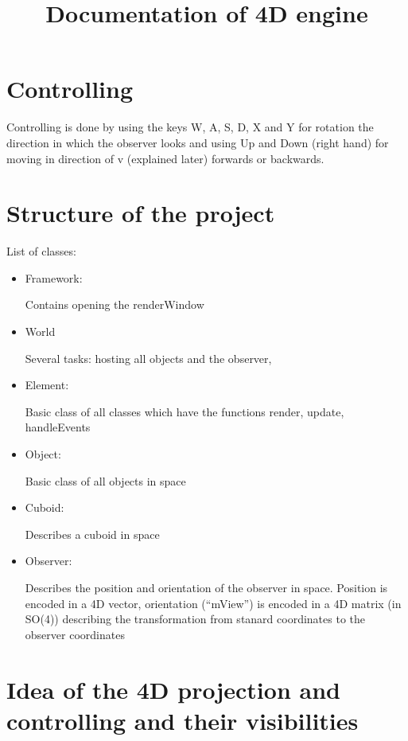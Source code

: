 \documentclass[titlepage]{scrartcl}
\begin{document}
\title{Documentation of 4D engine}

\maketitle


\section{Controlling}
Controlling is done by using the keys W, A, S, D, X and Y for rotation the direction in which the observer looks and using Up and Down (right hand) for moving in direction of v (explained later) forwards or backwards. 


\section{Structure of the project}

List of classes: 

\begin{itemize}
\item Framework: 

Contains opening the renderWindow

\item World

Several tasks: hosting all objects and the observer, 

\item Element:

Basic class of all classes which have the functions render, update, handleEvents

\item Object:

Basic class of all objects in space

\item Cuboid:

Describes a cuboid in space

\item Observer:

Describes the position and orientation of the observer in space. Position is encoded in a 4D vector, orientation (\enquote{mView}) is encoded in a 4D matrix (in SO(4)) describing the transformation from stanard coordinates to the observer coordinates 

\end{itemize}

\section{Idea of the 4D projection and controlling and their visibilities}
\end{document}
